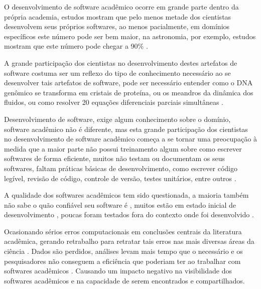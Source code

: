 O desenvolvimento de software acadêmico ocorre em grande parte dentro da
própria academia, estudos mostram que pelo menos metade dos cientistas desenvolvem
seus próprios softwares, ao menos pacialmente, em domínios específicos este
número pode ser bem maior, na astronomia, por exemplo, estudos mostram que este
número pode chegar a 90\% \cite{hettrick_2014_14809, momcheva2015software}.


A grande participação dos cientistas no desenvolvimento destes artefatos de
software costuma ser um reflexo do tipo de conhecimento necessário ao se
desenvolver tais artefatos de software, pode ser necessário entender como o DNA
genômico se transforma em cristais de proteína, ou os meandros da dinâmica dos
fluidos, ou como resolver 20 equações diferenciais parciais simultâneas
\cite{segal2008developing}.

Desenvolvimento de software, exige algum conhecimento sobre o domínio, software
acadêmico não é diferente, mas esta grande participação dos cientistas no
desenvolvimento de software acadêmico começa a se tornar uma preocupação à
medida que a maior parte não possui treinamento algum sobre como escrever
softwares de forma eficiente, muitos não testam ou documentam os seus
softwares, faltam práticas básicas de desenvolvimento, como escrever código
legível, revisão de código, controle de versão, testes unitários, entre outros
\cite{wilson2017good}.

A qualidade dos softwares acadêmicos tem sido questionada,
a maioria também não sabe o quão confiável seu software é \cite{Merali2010Computational},
muitos estão em estado inicial de desenvolvimento \cite{marshall2013tools},
poucas foram testados fora do contexto onde foi desenvolvido \cite{Portillo12}.

Ocasionando sérios erros computacionais em conclusões centrais da literatura
acadêmica, gerando retrabalho para retratar tais erros nas mais diversas áreas
da ciência \cite{Merali2010Computational}. Dados são perdidos, análises levam
mais tempo que o necessário e os pesquisadores não conseguem a eficiência que
poderiam ter ao trabalhar com softwares acadêmicos \cite{wilson2017good}.
Causando um impacto negativo na visibilidade dos softwares acadêmicos
\cite{howison2013, katz2014transitive} e na capacidade de serem encontrados e
compartilhados.


